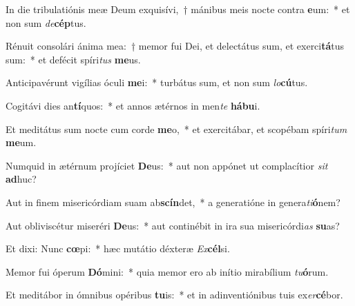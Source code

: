 \item In die tribulatiónis meæ Deum exquisívi,~† mánibus meis nocte contra \textbf{e}um:~* et non sum \textit{de}\textbf{cép}tus.
\item Rénuit consolári ánima mea:~† memor fui Dei, et delectátus sum, et exerci\textbf{tá}tus sum:~* et defécit spíri\textit{tus} \textbf{me}us.
\item Anticipavérunt vigílias óculi \textbf{me}i:~* turbátus sum, et non sum \textit{lo}\textbf{cú}tus.
\item Cogitávi dies an\textbf{tí}quos:~* et annos ætérnos in men\textit{te} \textbf{há}\textbf{bu}i.
\item Et meditátus sum nocte cum corde \textbf{me}o,~* et exercitábar, et scopébam spíri\textit{tum} \textbf{me}um.
\item Numquid in ætérnum projíciet \textbf{De}us:~* aut non appónet ut complacítior \textit{sit} \textbf{ad}huc?
\item Aut in finem misericórdiam suam ab\textbf{scín}det,~* a generatióne in genera\textit{ti}\textbf{ó}nem?
\item Aut obliviscétur miseréri \textbf{De}us:~* aut continébit in ira sua misericórdi\textit{as} \textbf{su}as?
\item Et dixi: Nunc \textbf{cœ}pi:~* hæc mutátio déxteræ \textit{Ex}\textbf{cél}si.
\item Memor fui óperum \textbf{Dó}mini:~* quia memor ero ab inítio mirabílium \textit{tu}\textbf{ó}rum.
\item Et meditábor in ómnibus opéribus \textbf{tu}is:~* et in adinventiónibus tuis ex\textit{er}\textbf{cé}bor.
